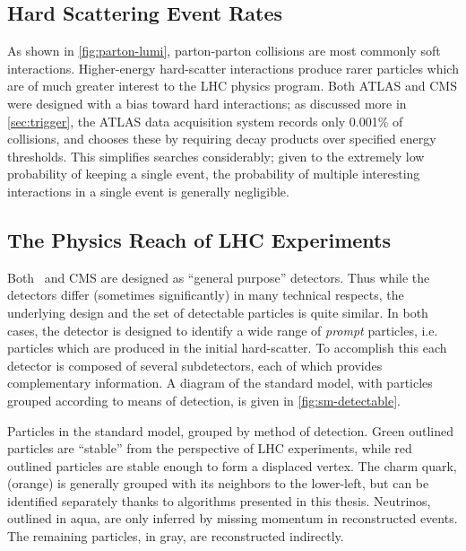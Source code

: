 \subsection{Hard Scattering Event Rates}
As shown in \cref{fig:parton-lumi}, parton-parton collisions are most commonly soft interactions.
Higher-energy hard-scatter interactions produce rarer particles which are of much greater interest to the LHC physics program.
Both ATLAS and CMS were designed with a bias toward hard interactions; as discussed more in \cref{sec:trigger}, the ATLAS data acquisition system records only 0.001\% of collisions, and chooses these by requiring decay products over specified energy thresholds.
This simplifies searches considerably; given to the extremely low probability of keeping a single event, the probability of multiple interesting interactions in a single event is generally negligible.


\subsection{The Physics Reach of LHC Experiments}
Both \atlas\ and CMS are designed as ``general purpose'' detectors.
Thus while the detectors differ (sometimes significantly) in many technical respects, the underlying design and the set of detectable particles is quite similar.
In both cases, the detector is designed to identify a wide range of \emph{prompt} particles, i.e. particles which are produced in the initial hard-scatter.
To accomplish this each detector is composed of several subdetectors, each of which provides complementary information.
A diagram of the standard model, with particles grouped according to means of detection, is given in \cref{fig:sm-detectable}.

\begin{cfig}
  \caption[Particles in the standard model grouped by detection method]{
    Particles in the standard model, grouped by method of detection.
    Green outlined particles are ``stable'' from the perspective of LHC experiments, while red outlined particles are stable enough to form a displaced vertex.
    The charm quark, (orange) is generally grouped with its neighbors to the lower-left, but can be identified separately thanks to algorithms presented in this thesis.
    Neutrinos, outlined in aqua, are only inferred by missing momentum in reconstructed events.
    The remaining particles, in gray, are reconstructed indirectly.
  }
  \label{fig:sm-detectable}
\end{cfig}

